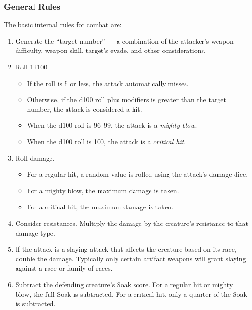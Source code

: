 \subsubsection{General Rules}

The basic internal rules for combat are:

\begin{enumerate}
\item Generate the ``target number'' --- a combination of the attacker's
weapon difficulty, weapon skill, target's evade, and other considerations.

\item Roll 1d100.
  \begin{itemize}
  \item If the roll is 5 or less, the attack automatically misses.

  \item Otherwise, if the d100 roll plus modifiers is greater than the 
  target number, the attack is considered a hit.  

  \item When the d100 roll is 96--99, the attack is a {\it mighty blow}.

  \item When the d100 roll is 100, the attack is a {\it critical hit}.
  \end{itemize}
\item Roll damage.
  \begin{itemize}
  \item For a regular hit, a random value is rolled using the attack's
  damage dice.

  \item For a mighty blow, the maximum damage is taken.

  \item For a critical hit, the maximum damage is taken.
  \end{itemize}

\item Consider resistances.  Multiply the damage by the creature's
resistance to that damage type.

\item If the attack is a slaying attack that affects the creature based on
its race, double the damage.  Typically only certain artifact weapons will
grant slaying against a race or family of races.

\item Subtract the defending creature's Soak score.  For a regular hit
or mighty blow, the full Soak is subtracted.  For a critical hit, only a
quarter of the Soak is subtracted.
\end{enumerate}

